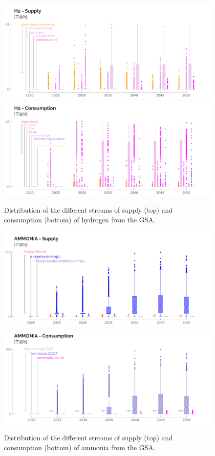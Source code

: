 \documentclass[11pt,twoside,a4paper,english]{article}
\begin{document}
\begin{appendices}
\begin{figure}[p!]
\centering
\includegraphics[width=\textwidth]{UQ_H2_Prod.pdf}
\includegraphics[width=\textwidth]{UQ_H2_Cons.pdf}
\caption{Distribution of the different streams of supply (top) and consumption (bottom) of hydrogen from the \acrfull{GSA}.}
\label{fig:results_uq_prod_cons_H2}
\end{figure}

\begin{figure}[p!]
\centering
\includegraphics[width=\textwidth]{UQ_Ammonia_Prod.pdf}
\includegraphics[width=\textwidth]{UQ_Ammonia_Cons.pdf}
\caption{Distribution of the different streams of supply (top) and consumption (bottom) of ammonia from the \acrfull{GSA}.}
\label{fig:results_uq_prod_cons_Ammonia}
\end{figure}


\end{appendices}
\end{document}
